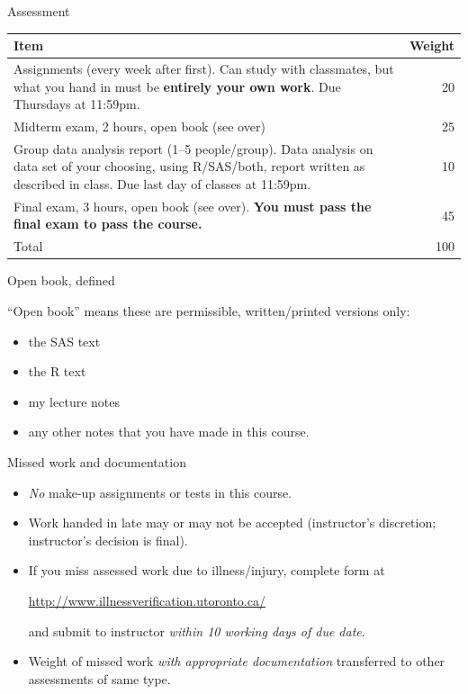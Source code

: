 \documentclass[unknownkeysallowed]{beamer}\usepackage[]{graphicx}\usepackage[]{color}
\begin{document}
\begin{frame}{Assessment}

  \begin{tabular}{p{3.5in}r}
    \hline
    Item & Weight\\
    \hline
    Assignments (every week after first). Can study with classmates, but what you hand in must
    be \textbf{entirely your own work}. Due Thursdays at 11:59pm. & 20\\
    \hline
    Midterm exam, 2 hours, open book (see over) & 25\\
    \hline
    Group data analysis report (1--5 people/group). Data analysis on data set of your choosing,
    using R/SAS/both, report written as described in class.
    Due last
    day of classes at 11:59pm. & 10 \\
    \hline
    Final exam, 3 hours, open book (see over). \textbf{You must pass
      the final exam to pass the course.} & 45\\
    \hline
    Total & 100\\
    \hline
  \end{tabular}

\bigskip

  
  
\end{frame}

\begin{frame}[fragile]{Open book, defined}
  
``Open book'' means these are permissible, written/printed versions only:

\begin{itemize}
\item the SAS text
\item the R text
\item my lecture notes
\item any other notes that you have made in this course.
\end{itemize}
  
  
\end{frame}

\begin{frame}[fragile]{Missed work and documentation}

  \begin{itemize}
  \item \emph{No} make-up  assignments or tests in this course.
  \item Work handed in late may or may not be accepted (instructor's
    discretion; instructor's decision is final).
  \item If you miss assessed work due to illness/injury, complete form
    at

\url{ http://www.illnessverification.utoronto.ca/}

    and submit to instructor \emph{within 10 working days of due date}.
  \item Weight of missed work \emph{with appropriate documentation}
    transferred to other assessments of same type.
  \end{itemize}
  
\end{frame}
\end{document}
